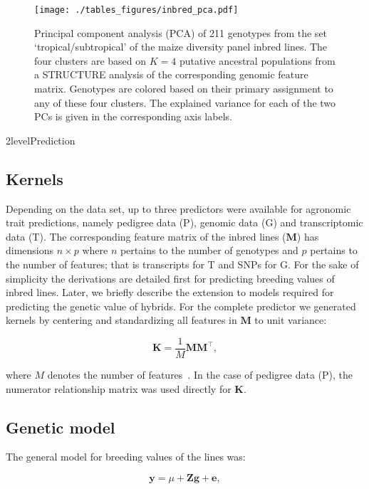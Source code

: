 \documentclass[12pt,titlepage]{article}
\begin{document}
\begin{figure}[H]
  \centering
  \texttt{[image: ./tables\_figures/inbred\_pca.pdf]}
  \caption{
  Principal component analysis (PCA) of 211 genotypes from the set
  `tropical/subtropical' of the maize diversity panel inbred lines.
  The four clusters are based on $K=4$ putative ancestral populations from a
  STRUCTURE analysis of the corresponding genomic feature matrix.
  Genotypes are colored based on their primary assignment to any of these four
  clusters.
  The explained variance for each of the two PCs is given in the corresponding
  axis labels.
}
\label{fig:inbred-pca}
\end{figure}



\Genetics2level{Prediction}
\subsection{Kernels}
Depending on the data set, up to three predictors were available for agronomic
trait predictions, namely pedigree data (P), genomic data (G) and
transcriptomic data (T).
The corresponding feature matrix of the inbred lines ($\mathbf{M}$) has
dimensions $n \times p$ where $n$ pertains to the number of genotypes and $p$
pertains to the number of features; that is transcripts for T and SNPs for G.
For the sake of simplicity the derivations are detailed first for predicting
breeding values of inbred lines.
Later, we briefly describe the extension to models required for predicting the
genetic value of hybrids.
For the complete predictor we generated kernels by centering and standardizing
all features in $\mathbf{M}$ to unit variance:

\begin{equation} \label{eq:GenomicRelationship}
  \mathbf{K} = \frac{1}{M} \mathbf{M} \mathbf{M}^{\top},
\end{equation}

where $M$ denotes the number of features~\cite{VanRaden2008}.
In the case of pedigree data (P), the numerator relationship matrix was used
directly for $\mathbf{K}$.


\subsection{Genetic model}
The general model for breeding values of the lines was:

\begin{equation} \label{eq:KBLUPModel}
  \mathbf{y} = \mu + \mathbf{Z} \mathbf{g} + \mathbf{e},
\end{equation}
\end{document}

